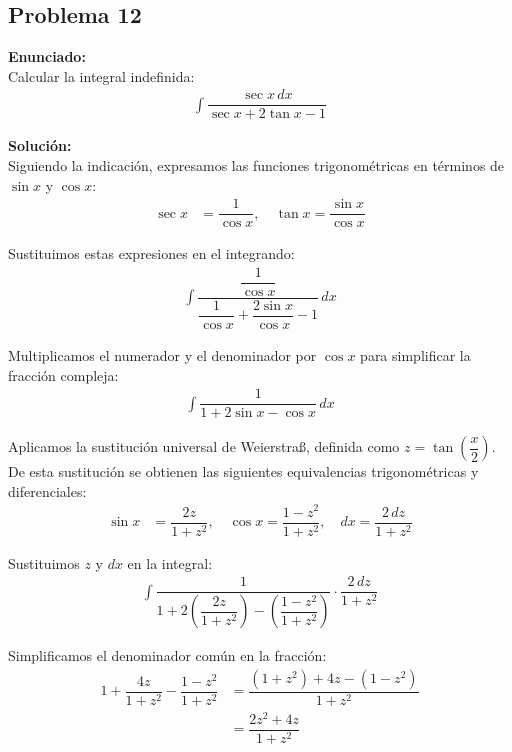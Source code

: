 \subsection*{Problema 12}

\textbf{Enunciado:} \\
Calcular la integral indefinida:
\begin{align*}
\int \dfrac{\sec x \, dx}{\sec x + 2\tan x - 1}
\end{align*}

\textbf{Solución:} \\
Siguiendo la indicación, expresamos las funciones trigonométricas en términos de $\sin x$ y $\cos x$:
\begin{align*}
\sec x &= \dfrac{1}{\cos x}, \quad 
\tan x = \dfrac{\sin x}{\cos x}
\end{align*}

Sustituimos estas expresiones en el integrando:
\begin{align*}
\int \dfrac{\dfrac{1}{\cos x}}{\dfrac{1}{\cos x} + \dfrac{2\sin x}{\cos x} - 1} \, dx
\end{align*}

Multiplicamos el numerador y el denominador por $\cos x$ para simplificar la fracción compleja:
\begin{align*}
\int \dfrac{1}{1 + 2\sin x - \cos x} \, dx
\end{align*}

Aplicamos la sustitución universal de Weierstraß, definida como $z = \tan\left(\dfrac{x}{2}\right)$. 
De esta sustitución se obtienen las siguientes equivalencias trigonométricas y diferenciales:
\begin{align*}
\sin x &= \dfrac{2z}{1 + z^2}, \quad 
\cos x = \dfrac{1 - z^2}{1 + z^2}, \quad
dx = \dfrac{2 \, dz}{1 + z^2}
\end{align*}

Sustituimos $z$ y $dx$ en la integral:
\begin{align*}
\int \dfrac{1}{1 + 2\left(\dfrac{2z}{1 + z^2}\right) - \left(\dfrac{1 - z^2}{1 + z^2}\right)} \cdot \dfrac{2 \, dz}{1 + z^2}
\end{align*}

Simplificamos el denominador común en la fracción:
\begin{align*}
1 + \dfrac{4z}{1 + z^2} - \dfrac{1 - z^2}{1 + z^2} &= \dfrac{(1 + z^2) + 4z - (1 - z^2)}{1 + z^2} \\
&= \dfrac{2z^2 + 4z}{1 + z^2}
\end{align*}

